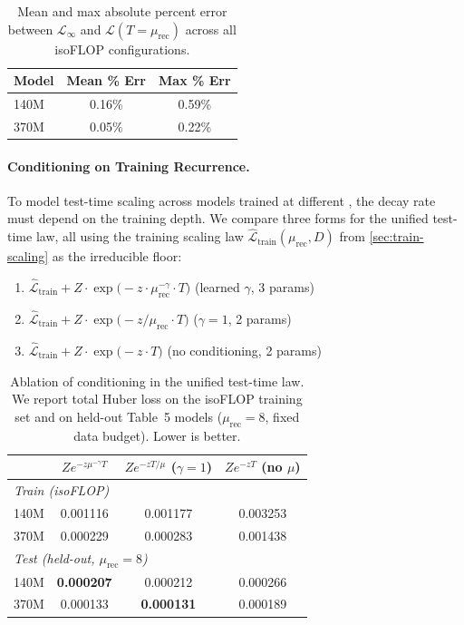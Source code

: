 \begin{table}[h]
\centering
\begin{tabular}{l cc}
\toprule
Model & Mean \% Err & Max \% Err \\
\midrule
140M & 0.16\% & 0.59\% \\
370M & 0.05\% & 0.22\% \\
\bottomrule
\end{tabular}
\caption{Mean and max absolute percent error between $\mathcal{L}_\infty$ and $\mathcal{L}(T{=}\mu_\text{rec})$ across all isoFLOP configurations.}
\label{tab:recovery}
\end{table}

\paragraph{Conditioning on Training Recurrence.}
To model test-time scaling across models trained at different \meanrecurrence, the decay rate must depend on the training depth. We compare three forms for the unified test-time law, all using the training scaling law $\hat{\mathcal{L}}_{\mathrm{train}}(\mu_{\text{rec}}, D)$ from \cref{sec:train-scaling} as the irreducible floor:
\begin{enumerate}[label=(\alph*), nosep]
  \item $\hat{\mathcal{L}}_{\mathrm{train}} + Z \cdot \exp\!\bigl(-z \cdot \mu_\text{rec}^{-\gamma} \cdot T\bigr)$ \hfill (learned $\gamma$, 3 params)
  \item $\hat{\mathcal{L}}_{\mathrm{train}} + Z \cdot \exp\!\bigl(-z / \mu_\text{rec}\cdot T\bigr)$ \hfill ($\gamma = 1$, 2 params)
  \item $\hat{\mathcal{L}}_{\mathrm{train}} + Z \cdot \exp\!\bigl(-z \cdot T\bigr)$ \hfill (no conditioning, 2 params)
\end{enumerate}
\begin{table}[h]
\centering
\begin{tabular}{l ccc}
\toprule
& $Z e^{-z \mu^{-\gamma} T}$ & $Z e^{-z T / \mu}$ ($\gamma{=}1$) & $Z e^{-z T}$ (no $\mu$) \\
\midrule
\multicolumn{4}{l}{\textit{Train (isoFLOP)}} \\
\quad 140M & 0.001116 & 0.001177 & 0.003253 \\
\quad 370M & 0.000229 & 0.000283 & 0.001438 \\
\midrule
\multicolumn{4}{l}{\textit{Test (held-out, $\mu_\text{rec}{=}8$)}} \\
\quad 140M & \textbf{0.000207} & 0.000212 & 0.000266 \\
\quad 370M & 0.000133 & \textbf{0.000131} & 0.000189 \\
\bottomrule
\end{tabular}
\caption{Ablation of \meanrecurrence conditioning in the unified test-time law. We report total Huber loss on the isoFLOP training set and on held-out Table~5 models ($\mu_\text{rec} = 8$, fixed data budget). Lower is better.}
\label{tab:mu-conditioning-ablation}
\end{table}

